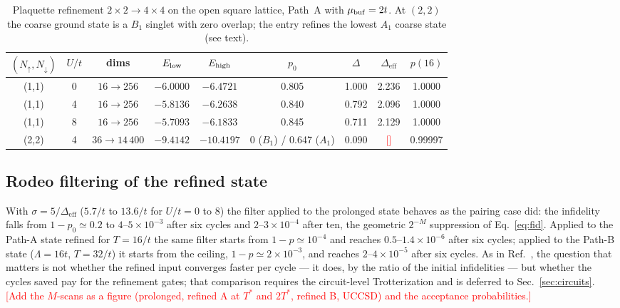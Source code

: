 \documentclass[
  aps,
  prc,
  reprint,
  superscriptaddress,
  floatfix,
  nofootinbib
]{revtex4-2}
\newcommand{\todo}[1]{\textcolor{red}{[#1]}}
\newcommand{\Deff}{\Delta_{\mathrm{eff}}}
\begin{document}
\begin{table}[t]
  \caption{Plaquette refinement $2\times2\to4\times4$ on the open square
  lattice, Path~A with $\mu_{\rm buf}=2t$.  At $(2,2)$ the coarse ground
  state is a $B_1$ singlet with zero overlap; the entry refines the lowest
  $A_1$ coarse state (see text).}
  \label{tab:2d}
  \begin{ruledtabular}
  \begin{tabular}{ccccccccc}
  $(N_\uparrow,N_\downarrow)$ & $U/t$ & dims & $E_{\rm low}$ & $E_{\rm high}$ & $p_0$ & $\Delta$ & $\Deff$ & $p(16)$\\
  \hline
  (1,1) & 0 & $16\to256$ & $-6.0000$ & $-6.4721$ & 0.805 & 1.000 & 2.236 & 1.0000\\
  (1,1) & 4 & $16\to256$ & $-5.8136$ & $-6.2638$ & 0.840 & 0.792 & 2.096 & 1.0000\\
  (1,1) & 8 & $16\to256$ & $-5.7093$ & $-6.1833$ & 0.845 & 0.711 & 2.129 & 1.0000\\
  (2,2) & 4 & $36\to14\,400$ & $-9.4142$ & $-10.4197$ & 0 ($B_1$) / 0.647 ($A_1$) & 0.090 & \todo{} & 0.99997\\
  \end{tabular}
  \end{ruledtabular}
\end{table}

\subsection{Rodeo filtering of the refined state}
\label{sec:res-rodeo}
With $\sigma=5/\Deff$ ($5.7/t$ to $13.6/t$ for $U/t=0$ to $8$) the filter
applied to the prolonged state behaves as the pairing case did: the
infidelity falls from $1-p_0\simeq0.2$ to $4$--$5\times10^{-3}$ after six
cycles and $2$--$3\times10^{-4}$ after ten, the geometric $2^{-M}$
suppression of Eq.~\eqref{eq:fid}.  Applied to the Path-A state refined for
$T=16/t$ the same filter starts from $1-p\simeq10^{-4}$ and reaches
$0.5$--$1.4\times10^{-6}$ after six cycles; applied to the Path-B state
($\Lambda=16t$, $T=32/t$) it starts from the ceiling, $1-p\simeq2\times10^{-3}$,
and reaches $2$--$4\times10^{-5}$ after six cycles.  As in
Ref.~\cite{EigenQPairing2026}, the question that matters is not whether the
refined input converges faster per cycle --- it does, by the ratio of the
initial infidelities --- but whether the cycles saved pay for the
refinement gates; that comparison requires the circuit-level
Trotterization and is deferred to Sec.~\ref{sec:circuits}.  \todo{Add the
$M$-scans as a figure (prolonged, refined A at $T^*$ and $2T^*$, refined B,
UCCSD) and the acceptance probabilities.}
\end{document}
